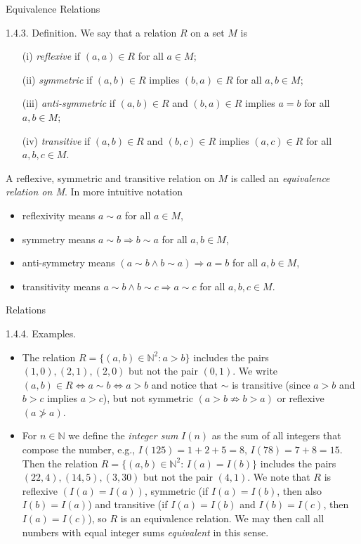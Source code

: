 \documentclass[smaller,hyperref={CJKbookmarks=true}]{beamer}
\newcommand{\N}{\mathbb{N}} \newcommand{\Z}{\mathbb{Z}} \newcommand{\Q}{\mathbb{Q}}
\begin{document}
\begin{frame}[t]{Equivalence Relations}
\begin{spacing}{1.05}
\alert{1.4.3. Definition.} We say that a relation $R$ on a set $M$ is
\begin{itemize}
  \item[(i)] \emph{reflexive} if $(a,a)\in R$ for all $a\in M$;
  \item[(ii)] \emph{symmetric} if $(a,b)\in R$ implies $(b,a)\in R$ for all $a,b\in M$;
  \item[(iii)] \emph{anti-symmetric} if $(a,b)\in R$ and $(b,a)\in R$ implies $a=b$ for all $a,b\in M$;
  \item[(iv)] \emph{transitive} if $(a,b)\in R$ and $(b,c)\in R$ implies $(a,c)\in R$ for all $a,b,c\in M$.
\end{itemize}
A reflexive, symmetric and transitive relation on $M$ is called an \emph{equivalence relation on M}. In more intuitive notation\\[5pt]
\begin{itemize}
  \item reflexivity means $a\sim a$ for all $a\in M$,
  \item symmetry means $a\sim b\Rightarrow b\sim a$ for all $a,b\in M$,
  \item anti-symmetry means $(a\sim b\wedge b\sim a)\Rightarrow a=b$ for all $a,b\in M$,
  \item transitivity means $a\sim b\wedge b\sim c\Rightarrow a\sim c$ for all $a,b,c\in M$.
\end{itemize}
\end{spacing}
\end{frame}
\begin{frame}[t]{Relations}
\begin{spacing}{1.1}
\alert{1.4.4. Examples.}
\begin{itemize}
  \item The relation $R=\{(a,b)\in\N^2\!:a>b\}$ includes the pairs $(1,0),(2,1),(2,0)$ but not the pair $(0,1)$. We write $(a,b)\in R\Leftrightarrow a\sim b\Leftrightarrow a>b$ and notice that $\sim$ is transitive (since $a>b$ and $b>c$ implies $a>c$), but not symmetric $(a>b\nRightarrow b>a)$ or reflexive $(a\ngtr a)$.
  \item For $n\in\N$ we define the \emph{integer sum} $I(n)$ as the sum of all integers that compose the number, e.g., $I(125)=1+2+5=8,\,I(78)=7+8=15$.\\[5pt]
      Then the relation $R=\{(a,b)\in\N^2\!:\,I(a)=I(b)\}$ includes the pairs $(22,4),(14,5),(3,30)$ but not the pair $(4,1)$. We note that $R$ is reflexive $(I(a)=I(a))$, symmetric (if $I(a)=I(b)$, then also $I(b)=I(a)$) and transitive (if $I(a)=I(b)$ and $I(b)=I(c)$, then $I(a)=I(c)$), so $R$ is an equivalence relation. We may then call all numbers with equal integer sums \emph{equivalent} in this sense.
\end{itemize}
\end{spacing}
\end{frame}
\end{document}
